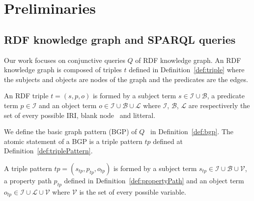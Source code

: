 \section{Preliminaries}






\subsection{RDF knowledge graph and SPARQL queries}
Our work focuses on conjunctive queries $Q$ of RDF knowledge graph.
An RDF knowledge graph is composed of triples $t$ defined in Definition~\ref{def:triple} where the subjects and objects are nodes of the graph and the predicates are the edges.

\begin{definition}\label{def:triple}
    An RDF triple $t = (s,p,o)$ is formed by a subject term $s \in \mathcal{I} \cup \mathcal{B}$, a predicate term  $p \in \mathcal{I}$ and an object term $o \in \mathcal{I} \cup \mathcal{B} \cup \mathcal{L}$
    where $\mathcal{I}$, $\mathcal{B}$, $\mathcal{L}$ are respectiverly the set of every possible IRI, blank node~ and litteral.
\end{definition}

We define the basic graph pattern (BGP) of $Q$~ in Definition~\ref{def:bgp}.
The atomic statement of a BGP is a triple pattern $tp$ defined at Definition~\ref{def:triplePattern}.

\begin{definition}\label{def:triplePattern}
    A triple pattern $tp = (s_{tp},p_{tp},o_{tp})$ is formed by a subject term $s_{tp} \in \mathcal{I} \cup \mathcal{B} \cup \mathcal{V}$, 
    a property path  $p_{tp}$ defined in Definition~\ref{def:propertyPath} and an object term  $o_{tp} \in \mathcal{I} \cup \mathcal{L} \cup \mathcal{V}$ 
    where $\mathcal{V}$ is the set of every possible variable. 
\end{definition}

